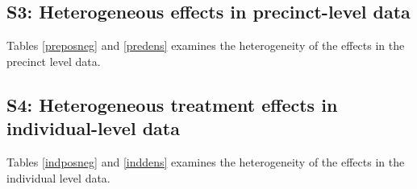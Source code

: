 \documentclass[12pt,a4paper]{article}
\begin{document}


\newpage

\subsection*{S3: Heterogeneous effects in precinct-level data}
Tables \ref{preposneg} and \ref{predens} examines the heterogeneity of the effects in the precinct level data.





\newpage



\subsection*{S4: Heterogeneous treatment effects in individual-level data}
Tables \ref{indposneg} and \ref{inddens} examines the heterogeneity of the effects in the individual level data.




\end{document}
